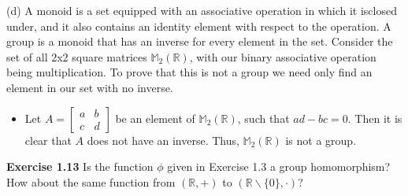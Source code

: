 \documentclass[12pt, a4paper]{article}
\begin{document}
\begin{flushleft}
\hspace*{10mm}(d) A monoid is a set equipped with an associative operation in which it is\linebreak \hspace*{16.7mm}closed under, and it also contains an identity element with respect to the\linebreak
\hspace*{16.7mm}operation. A group is a monoid that has an inverse for every element in\linebreak
\hspace*{16.7mm}the set. Consider the set of all 2x2 square matrices $\mathbb{M}_2(\mathbb{R})$, with our binary\linebreak
\hspace*{16.7mm}associative operation being multiplication. To prove that this is not a group\linebreak
\hspace*{16.7mm}we need only find an element in our set with no inverse. \vspace*{3mm}\linebreak

\begin{itemize}

\item Let $A=\left[ \begin{array}{cc} a & b \\ c & d \end{array} \right]$ be an element of $\mathbb{M}_2(\mathbb{R})$, such that $ad-bc=0$. Then it is clear\vspace*{2mm} that $A$ does not have an inverse. Thus, $\mathbb{M}_2(\mathbb{R})$ is not a group.\linebreak \par

\end{itemize}

\end{flushleft}


\begin{flushleft}
\hspace*{8mm}\textbf{Exercise 1.13} Is the function $\phi$ given in Exercise 1.3 a group homomorphism? How about the same function from $(\mathbb{R}, +)$ to $(\mathbb{R}\backslash \{ 0\}, \cdot)$?\linebreak

\end{flushleft}
\end{document}
